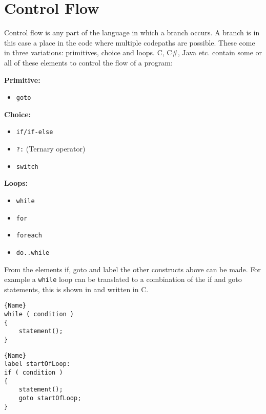 \section{Control Flow}\label{subsec:control-flow}
Control flow is any part of the language in which a branch occurs. 
A branch is in this case a place in the code where multiple codepaths are possible. 
These come in three variations: primitives, choice and loops.
C, C\#, Java etc. contain some or all of these elements to control the flow of a program:

\textbf{Primitive:}
\begin{itemize}[noitemsep,topsep=-5pt] %
    \item \texttt{goto}
\end{itemize}

\textbf{Choice:}
\begin{itemize}[noitemsep,topsep=-5pt] %
    \item \texttt{if/if-else}
    \item \texttt{?:} (Ternary operator)
    \item \texttt{switch}
\end{itemize}

\textbf{Loops:}
\begin{itemize}[noitemsep,topsep=-5pt] %
    \item \texttt{while}
    \item \texttt{for}
    \item \texttt{foreach}
    \item \texttt{do..while}
\end{itemize}

From the elements if, goto and label the other constructs above can be made.
For example a \texttt{while} loop can be translated to a combination of the if and goto statements, this is shown in  and  written in C. 

\noindent\begin{minipage}{.45\textwidth}
\begin{lstlisting}[caption=Loop made with while.,frame=tlrb, label=ifgotowhile1, numbers=none]{Name}
while ( condition )
{
    statement();
}
\end{lstlisting}
\end{minipage}\hfill
\begin{minipage}{.45\textwidth}
\begin{lstlisting}[caption=The same loop with if and goto.,frame=tlrb, label=ifgotowhile2, numbers=none]{Name}
label startOfLoop:
if ( condition )
{
    statement();
    goto startOfLoop;
}
\end{lstlisting}
\end{minipage}

